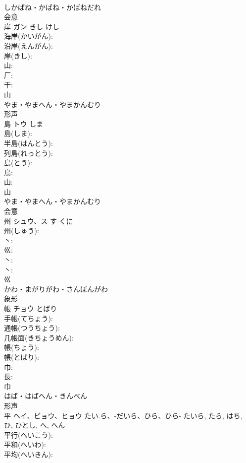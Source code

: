 \documentclass[8pt]{extreport}
\begin{document}
\begin{CJK}{UTF8}{min}
\\	しかばね・かばね・かばねだれ	
\\	会意 
\\	岸	ガン	きし	けし	
\\	海岸(かいがん): 
\\	沿岸(えんがん): 
\\	岸(きし): 
\\	山: 
\\	厂: 
\\	干: 
\\	山	
\\	やま・やまへん・やまかんむり	
\\	形声 
\\	島	トウ	しま		
\\	島(しま): 
\\	半島(はんとう): 
\\	列島(れっとう): 
\\	島(とう): 
\\	鳥: 
\\	山: 
\\	山	
\\	やま・やまへん・やまかんむり	
\\	会意 
\\	州	シュウ、ス	す	くに	
\\	州(しゅう): 
\\	丶: 
\\	巛: 
\\	丶: 
\\	丶: 
\\	巛	
\\	かわ・まがりがわ・さんぼんがわ	
\\	象形 
\\	帳	チョウ	とばり		
\\	手帳(てちょう): 
\\	通帳(つうちょう): 
\\	几帳面(きちょうめん): 
\\	帳(ちょう): 
\\	帳(とばり): 
\\	巾: 
\\	長: 
\\	巾	
\\	はば・はばへん・きんべん	
\\	形声 
\\	平	ヘイ、ビョウ、ヒョウ	たい.ら、-だいら、ひら、ひら-	たいら, たら, はち, ひ, ひとし, へ, へん	
\\	平行(へいこう): 
\\	平和(へいわ): 
\\	平均(へいきん): 

\end{CJK}
\end{document}
